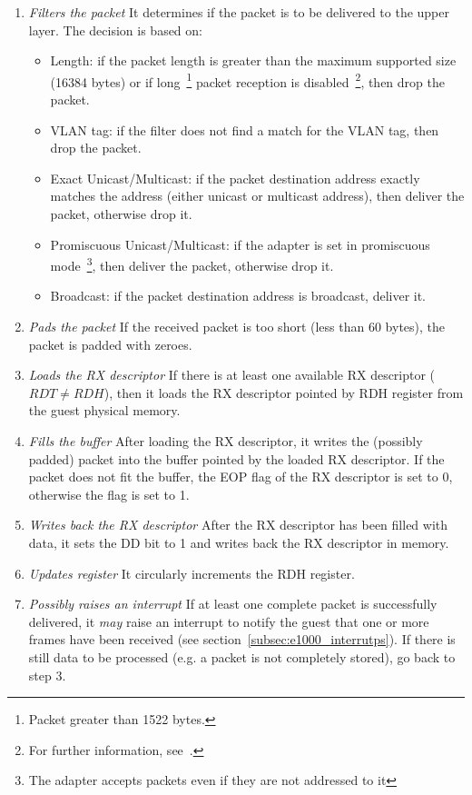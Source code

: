 \documentclass[a4paper, 12pt, titlepage]{report}
\begin{document}
\begin{enumerate}
\item \textit{Filters the packet} It determines if the packet is to be delivered to the upper layer. The decision is based on:
	\begin{itemize}
	\item Length: if the packet length is greater than the maximum supported size (16384 bytes) or if long~\footnote{Packet greater than 1522 bytes.} packet reception is disabled~\footnote{For further information, see~\cite{e1000}.}, then drop the packet.
	\item VLAN tag: if the filter does not find a match for the VLAN tag, then drop the packet.
	\item Exact Unicast/Multicast: if the packet destination address exactly matches the address (either unicast or multicast address), then deliver the packet, otherwise drop it.
	\item Promiscuous Unicast/Multicast: if the adapter is set in promiscuous mode~\footnote{The adapter accepts packets even if they are not addressed to it}, then deliver the packet, otherwise drop it.
	\item Broadcast: if the packet destination address is broadcast, deliver it.
	\end{itemize}
\item \textit{Pads the packet} If the received packet is too short (less than 60 bytes), the packet is padded with zeroes.
\item \textit{Loads the RX descriptor} If there is at least one available RX descriptor ($RDT \neq RDH$), then it loads the RX descriptor pointed by RDH register from the guest physical memory.
\item \textit{Fills the buffer} After loading the RX descriptor, it writes the (possibly padded) packet into the buffer pointed by the loaded RX descriptor. If the packet does not fit the buffer, the EOP flag of the RX descriptor is set to 0, otherwise the flag is set to 1.
\item \textit{Writes back the RX descriptor} After the RX descriptor has been filled with data, it sets the DD bit to 1 and writes back the RX descriptor in memory.
\item \textit{Updates register} It circularly increments the RDH register.
\item \textit{Possibly raises an interrupt} If at least one complete packet is successfully delivered, it \textit{may} raise an interrupt to notify the guest that one or more frames have been received (see section~\ref{subsec:e1000_interrutps}). If there is still data to be processed (e.g. a packet is not completely stored), go back to step 3.
\end{enumerate}
\end{document}
